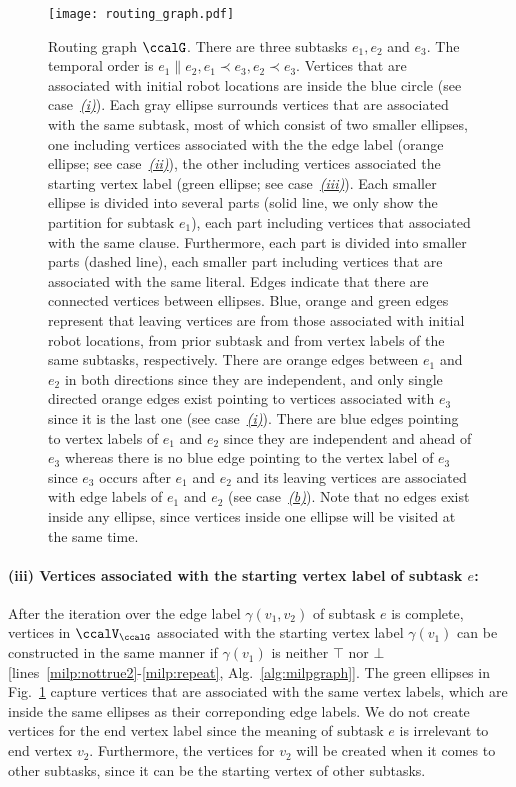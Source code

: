 \documentclass[Afour,sageh,times]{sagej}
\begin{document}
\begin{figure}[!t]
  \centering
  \texttt{[image: routing\_graph.pdf]}
  \caption{Routing graph $\ccalG$. There are three subtasks $e_1, e_2$ and $e_3$. The temporal order is $e_1 \| e_2, e_1 \prec e_3, e_2 \prec e_3$.    Vertices that are associated with initial robot locations are inside the blue circle (see case~\hyperref[vertex:initial]{\it (i)}). Each gray ellipse surrounds vertices that are associated with the same subtask, most of which consist of two smaller ellipses, one including vertices associated with the the edge label (orange ellipse; see case~\hyperref[vertex:edge]{\it (ii)}), the other including vertices associated the starting vertex label (green ellipse; see case~\hyperref[vertex:vertex]{\it (iii)}).  Each smaller ellipse is divided into several parts (solid line, we only show the partition for subtask $e_1$), each part including vertices that associated with the same clause. Furthermore, each part is divided into smaller parts (dashed line), each smaller part including vertices that are associated with the same literal.
    Edges indicate that there are connected vertices between  ellipses. Blue, orange and green  edges represent that leaving vertices are from those associated with initial robot locations, from  prior subtask and from vertex labels of the same subtasks, respectively. There are orange edges between $e_1$ and $e_2$ in both directions since they are independent, and only single directed orange edges exist pointing to vertices associated with $e_3$ since it is the last one {(see case~\hyperref[sec:b]{\it (i)})}. There are blue edges pointing to vertex labels of $e_1$ and $e_2$ since they are independent and ahead of $e_3$  whereas there is no blue edge pointing to the vertex label of $e_3$ since $e_3$ occurs after $e_1$ and $e_2$ and its leaving vertices are associated with  edge labels of $e_1$ and $e_2$ (see case~\hyperref[edge:vertex2]{\it (b)}).  Note that no edges exist inside any ellipse, since vertices inside one ellipse will be visited at the same time.}
  \label{fig:routing}
\end{figure}
\paragraph{(iii) Vertices associated with the starting vertex label of subtask $e$:}\label{vertex:vertex} After the iteration over the edge label $\gamma(v_1, v_2)$ of subtask $e$ is complete, vertices in $\ccalV_\ccalG$ associated with the starting  vertex label $\gamma(v_1)$ can be constructed in the same manner if $\gamma(v_1)$ is neither $\top$ nor $\bot$ [lines~\ref{milp:nottrue2}-\ref{milp:repeat}, Alg.~\ref{alg:milpgraph}]. The green ellipses in Fig.~\ref{fig:routing} capture vertices that are associated with the same vertex labels, which are inside the same ellipses as their correponding edge labels. We do not create vertices for the end vertex label since the meaning of subtask $e$ is irrelevant to end vertex $v_2$. Furthermore, the vertices for $v_2$ will be created when it comes to other subtasks, since it can be the starting vertex of other subtasks.
\end{document}
